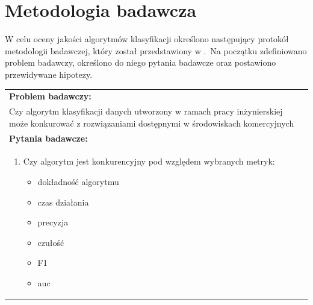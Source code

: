\section{Metodologia badawcza}
\label{sec:met}
W celu oceny jakości algorytmów klasyfikacji określono następujący protokół metodologii badawczej, który został przedstawiony w .\ Na początku zdefiniowano problem badawczy, określono do niego pytania badawcze oraz postawiono przewidywane hipotezy.
\vfill
\pagebreak
\begin{table}[H]
    \centering
    \begin{tabular}{|L{\textwidth}|}
        \hline
        \textbf{Problem badawczy:}                                                                                                                     \\
        Czy algorytm klasyfikacji danych utworzony w ramach pracy inżynierskiej może konkurować z rozwiązaniami dostępnymi w środowiskach komercyjnych \\ \hline

        \textbf{Pytania badawcze:}                                                                                                                     \\
        \begin{enumerate}
            \item Czy algorytm jest konkurencyjny pod względem wybranych metryk:
            \begin{itemize}
                \item dokładność algorytmu
                \item czas działania
                \item precyzja
                \item czułość
                \item F1
                \item auc
            \end{itemize}
        \end{enumerate}                                                                                                                                \\ \hline


\end{tabular}
\end{table}
